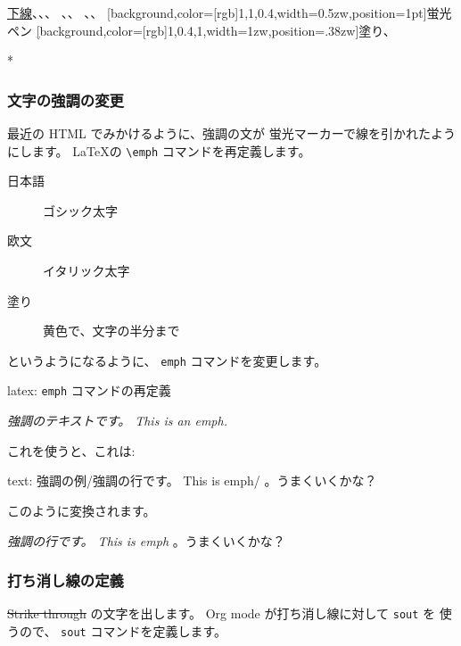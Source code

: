\documentclass[dvipdfmx,a4j,14pt,uplatex]{jsarticle}
\begin{document}
\uline{下線}、、、
、、
、、
\uline[background,color={[rgb]{1,1,0.4}},width=0.5zw,position=1pt]{蛍光ペン}
\uline[background,color={[rgb]{1,0.4,1}},width=1zw,position=.38zw]{塗り}、

*

\subsubsection{文字の強調の変更}
\label{sec:orga2f14bc}
最近の HTML でみかけるように、強調の文が
蛍光マーカーで線を引かれたようにします。
\LaTeX の \texttt{\textbackslash{}emph} コマンドを再定義します。

\begin{description}
\item[{日本語}] ゴシック太字
\item[{欧文}] イタリック太字
\item[{塗り}] 黄色で、文字の半分まで
\end{description}

というようになるように、 \texttt{emph} コマンドを変更します。

\begin{programlist}[label={orge02e1b9}]{latex}{: \texttt{emph} コマンドの再定義}\usepackage[usetype1]{uline--}

\renewcommand{\emph}[1]{%
  {\sffamily\bfseries\itshape%
    \uline[
      background,
      color={[rgb]{1,1,0.0}},
      width=0.8em,position=1pt]{#1}}}
\end{programlist}

\emph{強調のテキストです。 This is an emph.}

これを使うと、これは:
\begin{programlist}[label={orgebe1bd7}]{text}{: 強調の例}/強調の行です。 This is emph/ 。うまくいくかな？
\end{programlist}

このように変換されます。

\emph{強調の行です。 This is emph} 。うまくいくかな？

\subsubsection{打ち消し線の定義}
\label{sec:orga0b1a4c}
\sout{\sout{Strike through}} の文字を出します。
Org mode が打ち消し線に対して \texttt{sout} を
使うので、 \texttt{sout} コマンドを定義します。
\end{document}
